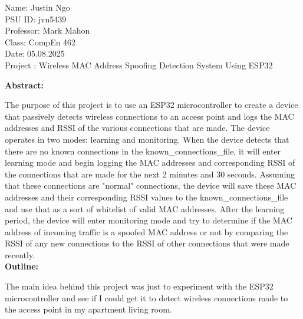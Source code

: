 \documentclass[letterpaper, 11pt]{article}
\def\class{CompEn 462}
\def\date{05.08.2025}
\def\professor{Mark Mahon}
\newcommand{\secHeader}[1]{\vspace{2mm} \noindent \textbf{#1:}\vspace{-4mm}}
\begin{document}
\hfill
\newline
Name: Justin Ngo
\\PSU ID: jvn5439
\\Professor: \professor
\\Class: \class
\\Date: \date
\\Project : Wireless MAC Address Spoofing Detection System Using ESP32

\newpage
\secHeader{Abstract}
\vspace{5mm}

The purpose of this project is to use an ESP32 microcontroller to create a device that passively detects wireless connections to an access point and logs the MAC addresses and RSSI of the various
connections that are made. The device operates in two modes: learning and monitoring. When the device detects that there are no known connections in the known\_connections\_file, it will enter
learning mode and begin logging the MAC addresses and corresponding RSSI of the connections that are made for the next 2 minutes and 30 seconds. Assuming that these connections are "normal" connections,
the device will save these MAC addresses and their corresponding RSSI values to the known\_connections\_file and use that as a sort of whitelist of valid MAC addresses. 
After the learning period, the device will enter monitoring mode and try to determine if the MAC address of incoming traffic is a spoofed MAC address or not by comparing the RSSI of any new connections
to the RSSI of other connections that were made recently. \\ 


\newpage
\secHeader{Outline}
\vspace{5mm}

The main idea behind this project was just to experiment with the ESP32 microcontroller and see if I could get it to detect wireless connections made to the access point in my apartment living room.
\end{document}
